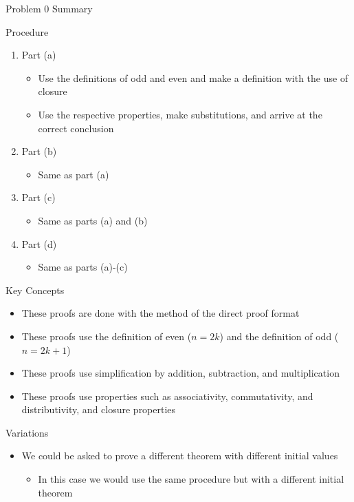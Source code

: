 \begin{summary}{Problem 0 Summary}
    \begin{statement}{Procedure}
        \begin{enumerate}[label = (\alph*)]
            \item Part (a)
            \begin{itemize}
                \item Use the definitions of odd and even and make a definition with the use of closure
                \item Use the respective properties, make substitutions, and arrive at the correct conclusion
            \end{itemize}
            \item Part (b)
            \begin{itemize}
                \item Same as part (a)
            \end{itemize}
            \item Part (c)
            \begin{itemize}
                \item Same as parts (a) and (b)
            \end{itemize}
            \item Part (d)
            \begin{itemize}
                \item Same as parts (a)-(c)
            \end{itemize}
        \end{enumerate}
    \end{statement}
    \begin{statement}{Key Concepts}
        \begin{itemize}
            \item These proofs are done with the method of the direct proof format
            \item These proofs use the definition of even ($n = 2k$) and the definition of odd ($n = 2k + 1$)
            \item These proofs use simplification by addition, subtraction, and multiplication
            \item These proofs use properties such as associativity, commutativity, and distributivity, and closure properties
        \end{itemize}
    \end{statement}
    \begin{statement}{Variations}
        \begin{itemize}
            \item We could be asked to prove a different theorem with different initial values
            \begin{itemize}
                \item In this case we would use the same procedure but with a different initial theorem
            \end{itemize}
        \end{itemize}
    \end{statement}
\end{summary}

